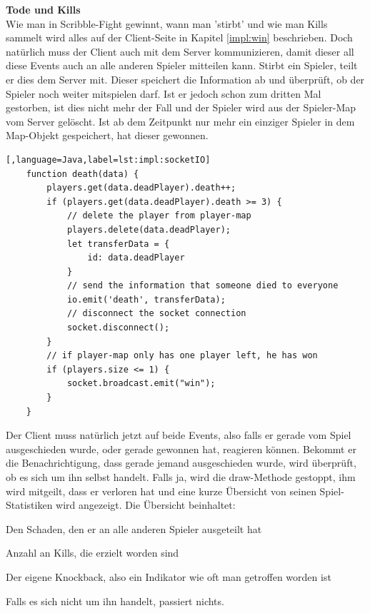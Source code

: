  \textbf{Tode und Kills} \\
 Wie man in Scribble-Fight gewinnt, wann man 'stirbt' und wie man Kills sammelt wird alles auf der Client-Seite in Kapitel \ref{impl:win} beschrieben. 
 Doch natürlich muss der Client auch mit dem Server kommunizieren, damit dieser all diese Events auch an alle anderen Spieler mitteilen kann.
 Stirbt ein Spieler, teilt er dies dem Server mit. Dieser speichert die Information ab und überprüft, ob der Spieler noch weiter mitspielen darf. 
 Ist er jedoch schon zum dritten Mal gestorben, ist dies nicht mehr der Fall und der Spieler wird aus der Spieler-Map vom Server gelöscht.
 Ist ab dem Zeitpunkt nur mehr ein einziger Spieler in dem Map-Objekt gespeichert, hat dieser gewonnen.

 \begin{lstlisting}[,language=Java,label=lst:impl:socketIO]
    function death(data) {
        players.get(data.deadPlayer).death++;
        if (players.get(data.deadPlayer).death >= 3) {
            // delete the player from player-map
            players.delete(data.deadPlayer);
            let transferData = {
                id: data.deadPlayer
            }
            // send the information that someone died to everyone
            io.emit('death', transferData);
            // disconnect the socket connection
            socket.disconnect();
        }
        // if player-map only has one player left, he has won 
        if (players.size <= 1) {
            socket.broadcast.emit("win");
        }
    }
 \end{lstlisting}

 Der Client muss natürlich jetzt auf beide Events, also falls er gerade vom Spiel ausgeschieden wurde, oder gerade gewonnen hat, reagieren können.
 Bekommt er die Benachrichtigung, dass gerade jemand ausgeschieden wurde, wird überprüft, ob es sich um ihn selbst handelt. 
 Falls ja, wird die draw-Methode gestoppt, ihm wird mitgeilt, dass er verloren hat und eine kurze Übersicht von seinen Spiel-Statistiken wird angezeigt.
 Die Übersicht beinhaltet:
 \begin{compactitem}
     \item Den Schaden, den er an alle anderen Spieler ausgeteilt hat
     \item Anzahl an Kills, die erzielt worden sind
     \item Der eigene Knockback, also ein Indikator wie oft man getroffen worden ist
 \end{compactitem}
 Falls es sich nicht um ihn handelt, passiert nichts.

